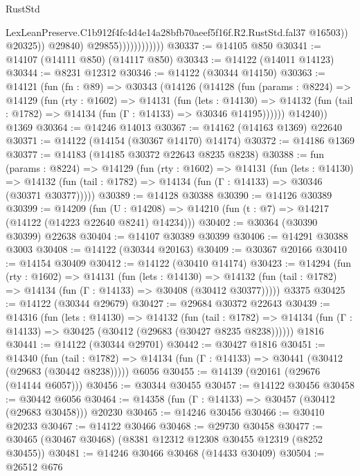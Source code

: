 \begin{lexlean}{RustStd}
\begin{coremodule}
                                      LexLeanPreserve.C1b912f4fc4d4e14a28bfb70aeef5f16f.R2.RustStd.fal37
                                      @16503))
                                  @20325))
                              @29840)
                            @29855))))))))))))
@30337 := @14105 @850
@30341 := @14107 (@14111 @850) (@14117 @850)
@30343 := @14122 (@14011 @14123)
@30344 := @8231 @12312
@30346 := @14122 (@30344 @14150)
@30363 := @14121
    (fun (fn : @89) =>
    @30343
      (@14126
        (@14128
          (fun (params : @8224) =>
          @14129
            (fun (rty : @1602) =>
            @14131
              (fun (lets : @14130) =>
              @14132 (fun (tail : @1782) => @14134 (fun (Γ : @14133) => @30346 @14195))))))
        @14240))
    @1369
@30364 := @14246 @14013
@30367 := @14162 (@14163 @1369) @22640
@30371 := @14122 (@14154 (@30367 @14170) @14174)
@30372 := @14186 @1369
@30377 := @14183 (@14185 @30372 @22643 @8235 @8238)
@30388 := fun (params : @8224) =>
  @14129
    (fun (rty : @1602) =>
    @14131
      (fun (lets : @14130) =>
      @14132 (fun (tail : @1782) => @14134 (fun (Γ : @14133) => @30346 (@30371 @30377)))))
@30389 := @14128 @30388
@30390 := @14126 @30389
@30399 := @14209
    (fun (U : @14208) => @14210 (fun (t : @7) => @14217 (@14122 (@14223 @22640 @8241) @14234)))
@30402 := @30364 (@30390 @30399) @22638
@30404 := @14107 @30389 @30399
@30406 := @14291 @30388 @3003
@30408 := @14122 (@30344 @20163)
@30409 := @30367 @20166
@30410 := @14154 @30409
@30412 := @14122 (@30410 @14174)
@30423 := @14294
    (fun (rty : @1602) =>
    @14131
      (fun (lets : @14130) =>
      @14132 (fun (tail : @1782) => @14134 (fun (Γ : @14133) => @30408 (@30412 @30377)))))
    @3375
@30425 := @14122 (@30344 @29679)
@30427 := @29684 @30372 @22643
@30439 := @14316
    (fun (lets : @14130) =>
    @14132
      (fun (tail : @1782) =>
      @14134 (fun (Γ : @14133) => @30425 (@30412 (@29683 (@30427 @8235 @8238))))))
    @1816
@30441 := @14122 (@30344 @29701)
@30442 := @30427 @1816
@30451 := @14340
    (fun (tail : @1782) => @14134 (fun (Γ : @14133) => @30441 (@30412 (@29683 (@30442 @8238)))))
    @6056
@30455 := @14139 (@20161 (@29676 (@14144 @6057)))
@30456 := @30344 @30455
@30457 := @14122 @30456
@30458 := @30442 @6056
@30464 := @14358 (fun (Γ : @14133) => @30457 (@30412 (@29683 @30458))) @20230
@30465 := @14246 @30456
@30466 := @30410 @20233
@30467 := @14122 @30466
@30468 := @29730 @30458
@30477 := @30465 (@30467 @30468) (@8381 @12312 @12308 @30455 @12319 (@8252 @30455))
@30481 := @14246 @30466 @30468 (@14433 @30409)
@30504 := @26512
    @676

\end{coremodule}
\end{lexlean}
